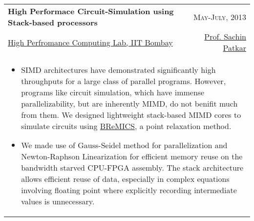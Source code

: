 \begin{tabularx}{.95\textwidth}{lr}
\textbf{High Performace Circuit-Simulation using Stack-based processors} & \textsc{May-July, 2013}\\
\href{https://www.ee.iitb.ac.in/~hpc/}{High Perfromance Computing Lab, IIT Bombay} & \href{https://www.ee.iitb.ac.in/wiki/faculty/patkar}{Prof. Sachin Patkar}\\
\multicolumn{2}{p{16cm}}{
\begin{itemize}
	\item SIMD architectures have demonstrated significantly high throughputs for a large class of parallel programs. However, programs like circuit simulation, which have immense parallelizability, but are inherently MIMD, do not benifit much from them. We designed lightweight stack-based MIMD cores to simulate circuits using \href{https://www.ee.iitb.ac.in/vlsi/wb/slides/workshop3/bremics.pdf}{BReMICS}, a point relaxation method.
	\item We made use of Gauss-Seidel method for parallelization and Newton-Raphson Linearization for efficient memory reuse on the bandwidth starved CPU-FPGA assembly. The stack architecture allows efficient reuse of data, especially in complex equations involving floating point where explicitly recording intermediate values is unnecessary.  
\end{itemize}
}\\
\end{tabularx}
